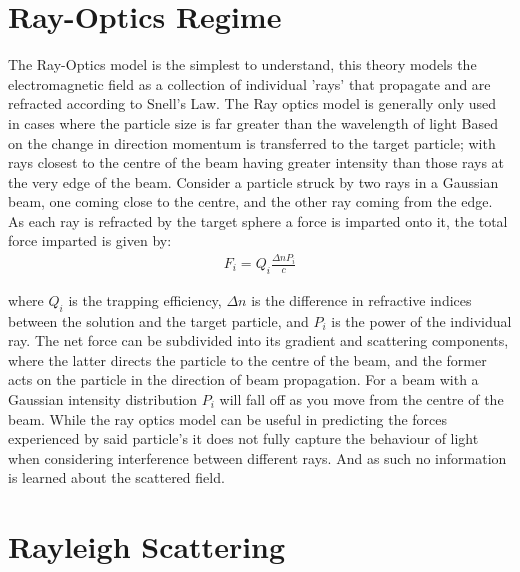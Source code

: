 \section{Ray-Optics Regime}

The Ray-Optics model is the simplest to understand, this theory models 
the electromagnetic field as a collection of individual 'rays' that 
propagate and are refracted according to Snell's Law. The Ray optics
model is generally only used in cases where the particle size is far
greater than the wavelength of light  Based on the change in direction 
momentum is transferred to the target particle; with rays closest to 
the centre of the beam having greater intensity than those rays at the 
very edge of the beam. Consider a particle struck by two rays in a 
Gaussian beam, one coming close to the centre, and the other ray 
coming from the edge. As each ray is refracted by the target sphere a 
force is imparted onto it, the total force imparted is given by:
\begin{align}
	F_i = Q_i\frac{\Delta n P_i}{c}
\end{align}

\noindent 
where $Q_i$ is the trapping efficiency, $\Delta n$ is the difference
in refractive indices between the solution and the target particle,
and $P_i$ is the power of the individual ray. The net force can be 
subdivided into its gradient and scattering components, where the latter
directs the particle to the centre of the beam, and the former acts on 
the particle in the direction of beam propagation. For a beam with a
Gaussian intensity distribution $P_i$ will fall off as you move from
the centre of the beam. While the ray optics model can be useful in 
predicting the forces experienced by said particle's it does not fully 
capture the behaviour of light when considering interference between 
different rays. And as such no information is learned about the scattered 
field.

\section{Rayleigh Scattering}

